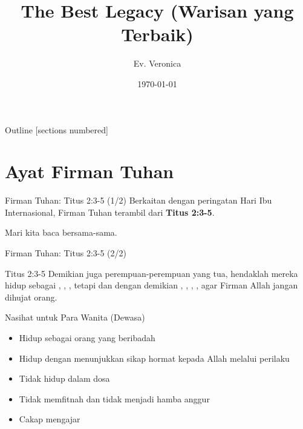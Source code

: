\documentclass[10pt,svgnames]{beamer} %
\title{The Best Legacy (Warisan yang Terbaik)}
\author[Name]{Ev. Veronica} %
\date{\today} %
\begin{document}
{
\maketitle
}%


\begin{frame}{Outline}
  [sections numbered] %
  \tableofcontents[hideallsubsections] %
\end{frame}

\section{Ayat Firman Tuhan}
\begin{frame}{Firman Tuhan: Titus 2:3-5 (1/2)}
	Berkaitan dengan peringatan Hari Ibu Internasional, Firman Tuhan terambil dari \textbf{Titus 2:3-5}.
	
	\bigskip
	Mari kita baca bersama-sama.
\end{frame}

\begin{frame}{Firman Tuhan: Titus 2:3-5 (2/2)}
	\begin{block}{Titus 2:3-5}
		Demikian juga perempuan-perempuan yang tua, hendaklah mereka hidup sebagai , , , tetapi   dan dengan demikian , , , , agar Firman Allah jangan dihujat orang.
	\end{block}	
\end{frame}


\begin{frame}{Nasihat untuk Para Wanita (Dewasa)}
	\begin{itemize}
		\item<2-> Hidup sebagai orang yang beribadah 
		\item<3-> Hidup dengan menunjukkan sikap hormat kepada Allah melalui perilaku
		\item<4-> Tidak hidup dalam dosa
		\item<5-> Tidak memfitnah dan tidak menjadi hamba anggur
		\item<6-> Cakap mengajar		
	\end{itemize}
\end{frame}
\end{document}
